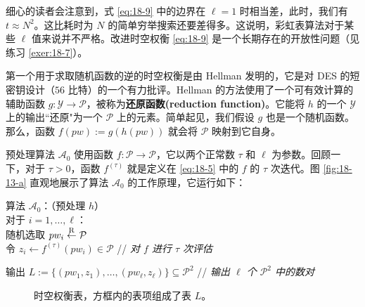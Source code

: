 细心的读者会注意到，式 \ref{eq:18-9} 中的边界在 $\ell=1$ 时相当差，此时，我们有 $t\approx N^2$。这比耗时为 $N$ 的简单穷举搜索还要差得多。这说明，彩虹表算法对于某些 $\ell$ 值来说并不严格。改进时空权衡 \ref{eq:18-9} 是一个长期存在的开放性问题（见练习 \ref{exer:18-7}）。

\begin{snote}
第一个用于求取随机函数的逆的时空权衡是由 Hellman 发明的，它是对 DES 的短密钥设计（$56$ 比特）的一个有力批评。Hellman 的方法使用了一个可有效计算的辅助函数 $g:\mathcal{Y}\to\mathcal{P}$，被称为\textbf{还原函数(reduction function)}。它能将 $h$ 的一个 $\mathcal{Y}$ 上的输出``还原"为一个 $\mathcal{P}$ 上的元素。简单起见，我们假设 $g$ 也是一个随机函数。那么，函数 $f(pw):=g(h(pw))$ 就会将 $\mathcal{P}$ 映射到它自身。

预处理算法 $\mathcal{A}_0$ 使用函数 $f:\mathcal{P}\to\mathcal{P}$，它以两个正常数 $\tau$ 和 $\ell$ 为参数。回顾一下，对于 $\tau>0$，函数 $f^{(\tau)}$ 就是定义在 \ref{eq:18-5} 中的 $f$ 的 $\tau$ 次迭代。图 \ref{fig:18-13-a} 直观地展示了算法 $\mathcal{A}_0$ 的工作原理，它运行如下：

\vspace*{10pt}

\hspace*{5pt} 算法 $\mathcal{A}_0$：（预处理 $h$）\\
\hspace*{50pt} 对于 $i=1,\dots,\ell$：\\
\hspace*{75pt} 随机选取 $pw_i\overset{\rm R}\leftarrow\mathcal{P}$\\
\hspace*{75pt} 令 $z_i\leftarrow f^{(\tau)}(pw_i)\in\mathcal{P}$
\hspace*{100pt} // \emph{对 $f$ 进行 $\tau$ 次评估}

\vspace*{5pt}

\hspace*{28.5pt} 输出 $L:=\big\{(pw_1,z_1),\dots,(pw_\ell,z_\ell)\big\}\subseteq\mathcal{P}^2$
\hspace*{37pt} // \emph{输出 $\ell$ 个 $\mathcal{P}^2$ 中的数对}

\vspace*{10pt}

\begin{figure}
  \centering
  \subfigure[彩虹表]{
      
  	  \label{fig:18-13-b}
  }
  \caption{时空权衡表，方框内的表项组成了表 $L$。}
  \label{fig:18-13}
\end{figure}


\end{snote}
